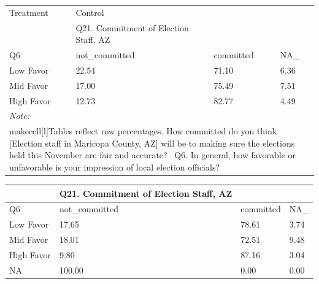 \documentclass[
  11pt,
  a4paper,
]{article}
\begin{document}
\begin{table}
\centering
\centering
\begin{tabular}[t]{l|l|l|l}
\hline
\multicolumn{1}{l|}{Treatment} & \multicolumn{1}{l}{Control} \\
\cline{1-1} \cline{2-2}
 & Q21. Commitment of Election Staff, AZ &  & \\
\hline
Q6 & not\_committed & committed & NA\_\\
\hline
Low Favor & 22.54 & 71.10 & 6.36\\
\hline
Mid Favor & 17.00 & 75.49 & 7.51\\
\hline
High Favor & 12.73 & 82.77 & 4.49\\
\hline
\multicolumn{4}{l}{\rule{0pt}{1em}\textit{Note: }}\\
\multicolumn{4}{l}{\rule{0pt}{1em}makecell[l]{Tables reflect row percentages\Q21. How committed do you think [Election staff in Maricopa County, AZ] will be to making sure the elections held this November are fair and accurate? \ Q6. In general, how favorable or unfavorable is your impression of local election officials?}}\\
\end{tabular}
\centering
\begin{tabular}[t]{l|l|l|l}
\hline
 & Q21. Commitment of Election Staff, AZ &  & \\
\hline
Q6 & not\_committed & committed & NA\_\\
\hline
Low Favor & 17.65 & 78.61 & 3.74\\
\hline
Mid Favor & 18.01 & 72.51 & 9.48\\
\hline
High Favor & 9.80 & 87.16 & 3.04\\
\hline
NA & 100.00 & 0.00 & 0.00\\
\hline
\end{tabular}
\end{table}
\end{document}
